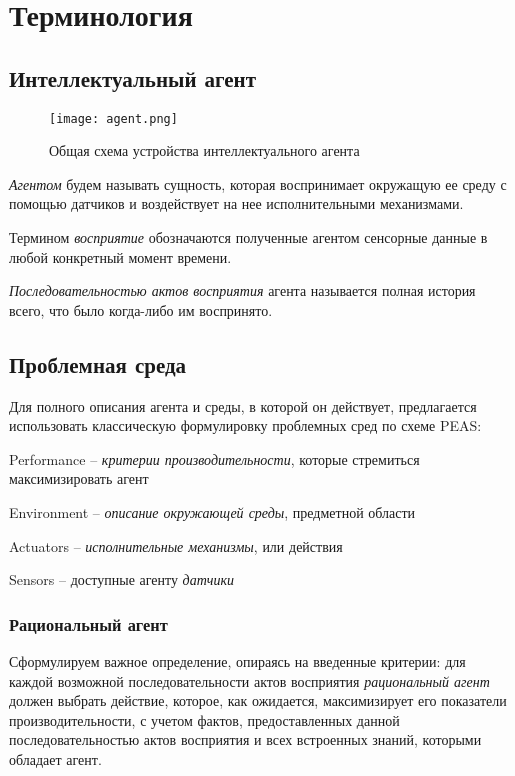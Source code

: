 \chapter{Терминология}

\section{Интеллектуальный агент}

\begin{figure}[h]
\centering
\texttt{[image: agent.png]}
\caption{Общая схема устройства интеллектуального агента}
\end{figure}



\emph{Агентом} будем называть сущность, которая воспринимает окружащую
ее среду с помощью датчиков и воздействует на нее исполнительными
механизмами.

Термином \emph{восприятие} обозначаются полученные агентом сенсорные
данные в любой конкретный момент времени.

\emph{Последовательностью актов восприятия} агента называется полная
история всего, что было когда-либо им воспринято.

\section{Проблемная среда}

Для полного описания агента и среды, в которой он действует,
предлагается использовать классическую формулировку проблемных сред по
схеме PEAS:

\begin{itemize*}
\item
  Performance -- \emph{критерии производительности}, которые стремиться
  максимизировать агент
\item
  Environment -- \emph{описание окружающей среды}, предметной области
\item
  Actuators -- \emph{исполнительные механизмы}, или действия
\item
  Sensors -- доступные агенту \emph{датчики}
\end{itemize*}

\subsection{Рациональный агент}

Сформулируем важное определение, опираясь на введенные критерии: для каждой возможной последовательности актов восприятия
\emph{рациональный агент} должен выбрать действие, которое, как
ожидается, максимизирует его показатели производительности, с учетом
фактов, предоставленных данной последовательностью актов восприятия и
всех встроенных знаний, которыми обладает агент.

